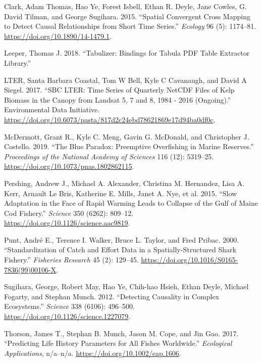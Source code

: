 \documentclass[]{article}
\begin{document}
\leavevmode\hypertarget{ref-clark2015}{}%
Clark, Adam Thomas, Hao Ye, Forest Isbell, Ethan R. Deyle, Jane Cowles, G. David Tilman, and George Sugihara. 2015. ``Spatial Convergent Cross Mapping to Detect Causal Relationships from Short Time Series.'' \emph{Ecology} 96 (5): 1174--81. \url{https://doi.org/10.1890/14-1479.1}.

\leavevmode\hypertarget{ref-leeper2018}{}%
Leeper, Thomas J. 2018. ``Tabulizer: Bindings for Tabula PDF Table Extractor Library.''

\leavevmode\hypertarget{ref-lter2017}{}%
LTER, Santa Barbara Coastal, Tom W Bell, Kyle C Cavanaugh, and David A Siegel. 2017. ``SBC LTER: Time Series of Quarterly NetCDF Files of Kelp Biomass in the Canopy from Landsat 5, 7 and 8, 1984 - 2016 (Ongoing).'' Environmental Data Initiative. \url{https://doi.org/10.6073/pasta/817d2c24ebd78621869e17d94ba0df0c}.

\leavevmode\hypertarget{ref-mcdermott2019}{}%
McDermott, Grant R., Kyle C. Meng, Gavin G. McDonald, and Christopher J. Costello. 2019. ``The Blue Paradox: Preemptive Overfishing in Marine Reserves.'' \emph{Proceedings of the National Academy of Sciences} 116 (12): 5319--25. \url{https://doi.org/10.1073/pnas.1802862115}.

\leavevmode\hypertarget{ref-pershing2015a}{}%
Pershing, Andrew J., Michael A. Alexander, Christina M. Hernandez, Lisa A. Kerr, Arnault Le Bris, Katherine E. Mills, Janet A. Nye, et al. 2015. ``Slow Adaptation in the Face of Rapid Warming Leads to Collapse of the Gulf of Maine Cod Fishery.'' \emph{Science} 350 (6262): 809--12. \url{https://doi.org/10.1126/science.aac9819}.

\leavevmode\hypertarget{ref-punt2000}{}%
Punt, André E., Terence I. Walker, Bruce L. Taylor, and Fred Pribac. 2000. ``Standardization of Catch and Effort Data in a Spatially-Structured Shark Fishery.'' \emph{Fisheries Research} 45 (2): 129--45. \url{https://doi.org/10.1016/S0165-7836(99)00106-X}.

\leavevmode\hypertarget{ref-sugihara2012}{}%
Sugihara, George, Robert May, Hao Ye, Chih-hao Hsieh, Ethan Deyle, Michael Fogarty, and Stephan Munch. 2012. ``Detecting Causality in Complex Ecosystems.'' \emph{Science} 338 (6106): 496--500. \url{https://doi.org/10.1126/science.1227079}.

\leavevmode\hypertarget{ref-thorson2017c}{}%
Thorson, James T., Stephan B. Munch, Jason M. Cope, and Jin Gao. 2017. ``Predicting Life History Parameters for All Fishes Worldwide.'' \emph{Ecological Applications}, n/a--n/a. \url{https://doi.org/10.1002/eap.1606}.
\end{document}

